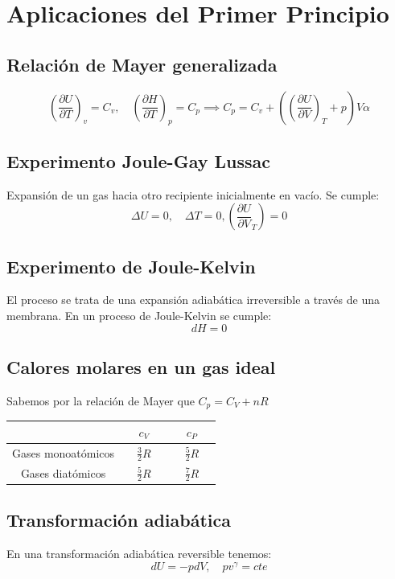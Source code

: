 \documentclass[leqno]{article}
\begin{document}
\section{Aplicaciones del Primer Principio}
\subsection{Relación de Mayer generalizada}
\[
  \left( \frac{\partial U}{\partial T} \right)_v = C_v , \quad \left( \frac{\partial H}{\partial T} \right)_p=C_p \implies C_p=C_v + \left( \left( \frac{\partial U}{\partial V} \right)_T + p  \right)V\alpha 
\] 
\subsection{Experimento Joule-Gay Lussac}
Expansión de un gas hacia otro recipiente inicialmente en vacío. Se cumple:
\[
\Delta U = 0, \quad \Delta T=0, \left( \frac{\partial U}{\partial V}_T \right) =0
\] 

\subsection{Experimento de Joule-Kelvin}
El proceso se trata de una expansión adiabática irreversible a través de una membrana. En un proceso de Joule-Kelvin se cumple:
\[
dH=0 
\] 
\subsection{Calores molares en un gas ideal}
Sabemos por la relación de Mayer que $C_p = C_V + nR$
 \begin{center}
\begin{tabular}{|c|c|c|}
\hline
 & $c_V$ & $c_P$ \\
\hline 
  Gases monoatómicos & $\quad \frac{3}{2}R\quad$ & $\quad \frac{5}{2}R\quad$ \\
  \hline
  Gases diatómicos & $\quad\frac{5}{2}R\quad$ & $\quad\frac{7}{2}R\quad$ \\
  \hline

\end{tabular}
\end{center}

\subsection{Transformación adiabática}
En una transformación adiabática reversible tenemos:
\[
dU = -pdV, \quad pv^\gamma=cte
\] 
\end{document}

